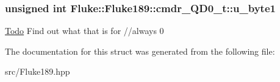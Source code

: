 \hypertarget{structFluke_1_1Fluke189_1_1cmdr__QD0__t_a835768e5aabd53d41e1e7a4d10fdde1f}{
\subsubsection[{u\_\-byte1}]{\setlength{\rightskip}{0pt plus 5cm}unsigned int {\bf Fluke::Fluke189::cmdr\_\-QD0\_\-t::u\_\-byte1}}}
\label{structFluke_1_1Fluke189_1_1cmdr__QD0__t_a835768e5aabd53d41e1e7a4d10fdde1f}
\begin{Desc}
\item[\hyperlink{todo__todo000017}{Todo}]Find out what that is for //always 0 \end{Desc}


The documentation for this struct was generated from the following file:\begin{DoxyCompactItemize}
\item 
src/Fluke189.hpp\end{DoxyCompactItemize}

